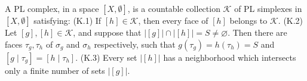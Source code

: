 A PL complex, in a space $[X, \emptyset]$, is a countable collection $\mathcal{K}$ of PL simplexes in $[X, \emptyset]$ satisfying:
(K.1) If $[h] \in \mathcal{K}$, then every face of $[h]$ belongs to $\mathcal{K}$.
(K.2) Let $[g], [h] \in \mathcal{K}$, and suppose that $|[g]| \cap |[h]| = S \neq \varnothing$. Then there are faces $\tau_g, \tau_h$ of $\sigma_g$ and $\sigma_h$ respectively, such that $g(\tau_g) = h(\tau_h) = S$ and $[g \mid \tau_g] = [h \mid \tau_h]$.
(K.3) Every set $|[h]|$ has a neighborhood which intersects only a finite number of sets $|[g]|$.

